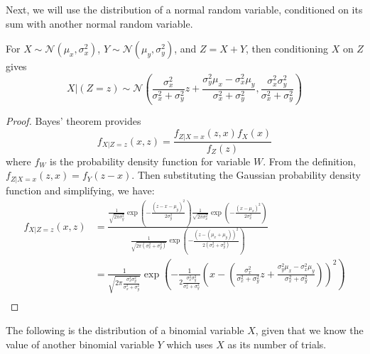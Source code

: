 \documentclass[final,12pt]{colt2022} %
\begin{document}
\noindent Next, we will use the distribution of a normal random variable, conditioned on its sum with another normal random variable. 

\begin{lemma}\label{lemma:bayes}
For $X \sim \mathcal N(\mu_x, \sigma_x^2)$, $Y \sim \mathcal N(\mu_y, \sigma_y^2)$, and $Z = X + Y$, then conditioning $X$ on $Z$ gives \[X |(Z = z) \sim \mathcal N\left(\frac{\sigma_x^2}{\sigma_x^2 + \sigma_y^2}z + \frac{\sigma_y^2\mu_x- \sigma_x^2\mu_y}{\sigma_x^2 + \sigma_y^2}, \frac{\sigma_x^2\sigma_y^2}{\sigma_x^2 + \sigma_y^2}\right)\]
\end{lemma}

\begin{proof}
Bayes' theorem provides \[f_{X|Z=z}(x, z) = \frac{f_{Z | X=x}(z, x)f_X(x)}{f_Z(z)}\] where $f_W$ is the probability density function for variable $W$. From the definition, $f_{Z | X = x}(z, x) = f_Y(z - x)$. Then substituting the Gaussian probability density function and simplifying, we have: \begin{align*}
    f_{X|Z=z}(x, z) &= \frac{\frac{1}{\sqrt{2\pi\sigma_y^2}}\exp\left(-\frac{(z-x - \mu_y)^2}{2\sigma_y^2}\right) \frac{1}{\sqrt{2\pi\sigma_x^2}} \exp\left(-\frac{(x-\mu_x)^2}{2\sigma_x^2}\right)}{\frac{1}{\sqrt{2\pi(\sigma_x^2 + \sigma_y^2)}} \exp\left(-\frac{(z-(\mu_x + \mu_y))^2}{2(\sigma_x^2 + \sigma_y^2)}\right)}\\
    &= \frac{1}{\sqrt{2\pi \frac{\sigma_x^2\sigma_y^2}{\sigma_x^2 + \sigma_y^2}}} \exp\left(-\frac{1}{2\frac{\sigma_x^2\sigma_y^2}{\sigma_x^2+\sigma_y^2}}\left(x - \left(\frac{\sigma_x^2}{\sigma_x^2 + \sigma_y^2}z + \frac{\sigma_y^2\mu_x- \sigma_x^2\mu_y}{\sigma_x^2 + \sigma_y^2}\right)\right)^2\right)\\
\end{align*}
\end{proof}

\noindent The following is the distribution of a binomial variable $X$, given that we know the value of another binomial variable $Y$ which uses $X$ as its number of trials.
\end{document}
